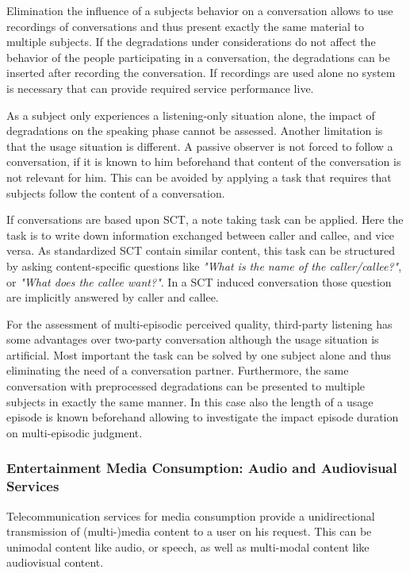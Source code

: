 Elimination the influence of a subjects behavior on a conversation allows to use recordings of conversations and thus present exactly the same material to multiple subjects.
If the degradations under considerations do not affect the behavior of the people participating in a conversation, the degradations can be inserted after recording the conversation.
If recordings are used alone no system is necessary that can provide required service performance live.

As a subject only experiences a listening-only situation alone, the impact of degradations on the speaking phase cannot be assessed.
Another limitation is that the usage situation is different.
A passive observer is not forced to follow a conversation, if it is known to him beforehand that content of the conversation is not relevant for him.
This can be avoided by applying a task that requires that subjects follow the content of a conversation.

If conversations are based upon \acs{SCT}, a note taking task can be applied.
Here the task is to write down information exchanged between caller and callee, and vice versa.
As standardized \acs{SCT} \citep{itu-t_p.805:_2007} contain similar content, this task can be structured by asking content-specific questions like \emph{"What is the name of the caller/callee?"}, or \emph{"What does the callee want?"}.
In a \ac{SCT} induced conversation those question are implicitly answered by caller and callee.

For the assessment of multi-episodic perceived quality, third-party listening has some advantages over two-party conversation although the usage situation is artificial.
Most important the task can be solved by one subject alone and thus eliminating the need of a conversation partner.
Furthermore, the same conversation with preprocessed degradations can be presented to multiple subjects in exactly the same manner.
In this case also the length of a usage episode is known beforehand allowing to investigate the impact episode duration on multi-episodic judgment.

\subsubsection{Entertainment Media Consumption: Audio and Audiovisual Services}
Telecommunication services for media consumption provide a unidirectional transmission of (multi-)media content to a user on his request.
This can be unimodal content like audio, or speech, as well as multi-modal content like audiovisual content.

